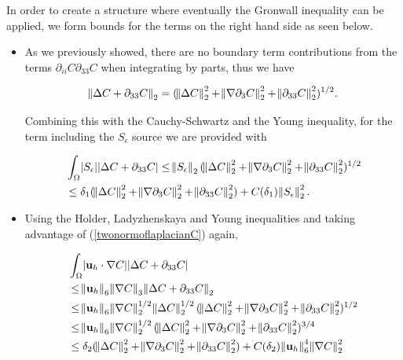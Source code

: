 \documentclass[11pt]{article}
\begin{document}
In order to create a structure where eventually the Gronwall inequality can be applied, we form bounds for the terms on the right hand side as seen below.

\begin{itemize}

\item As we previously showed, there are no boundary term contributions from the terms $\partial_{ii} C \partial_{33} C$ when integrating by parts, thus we have

\begin{equation} \norm{\Delta C + \partial_{33} C }_2 = (\norm{\Delta C}_2^2 + \norm{\nabla \partial_3 C}_2^2 + \norm{\partial_{33} C}_2^2)^{1/2}.\label{twonormoflaplacianC}\end{equation}

Combining this with the Cauchy-Schwartz and the Young inequality, for the term including the $S_\epsilon$ source we are provided with

\begin{equation}
  \begin{split}
  & \int_\Omega \abs{S_\epsilon} \abs{\Delta C + \partial_{33} C} \leq \norm{S_\epsilon}_2 (\norm{\Delta C}_2^2 + \norm{\nabla \partial_3 C}_2^2 + \norm{\partial_{33} C}_2^2)^{1/2} \\
  & \leq \delta_1 (\norm{\Delta C}_2^2 + \norm{\nabla \partial_3 C}_2^2 + \norm{\partial_{33} C}_2^2) + C(\delta_1)\norm{S_\epsilon}_2^2.
  \end{split}
\end{equation}

\item Using the Holder, Ladyzhenskaya and Young inequalities and taking advantage of (\ref{twonormoflaplacianC}) again,

\begin{equation}
  \begin{split}
  & \int_\Omega \abs{ \mathbf{u}_h \cdot \nabla C } \abs{ \Delta C + \partial_{33} C } \\
  & \leq \norm{\mathbf{u}_h}_6 \norm{\nabla C}_3 \norm{\Delta C + \partial_{33} C}_2 \\
  & \leq \norm{\mathbf{u}_h}_6 \norm{\nabla C}_2^{1/2} \norm{\Delta C}_2^{1/2} (\norm{\Delta C}_2^2 + \norm{\nabla \partial_3 C}_2^2 + \norm{\partial_{33} C}_2^2)^{1/2} \\
  & \leq \norm{\mathbf{u}_h}_6 \norm{\nabla C}_2^{1/2} (\norm{\Delta C}_2^2 + \norm{\nabla \partial_3 C}_2^2 + \norm{\partial_{33} C}_2^2)^{3/4} \\
  & \leq \delta_2 (\norm{\Delta C}_2^2 + \norm{\nabla \partial_3 C}_2^2 + \norm{\partial_{33} C}_2^2) + C(\delta_2) \norm{\mathbf{u}_h}_6^4 \norm{\nabla C}_2^2
  \end{split}
\end{equation}


\end{itemize}
\end{document}
